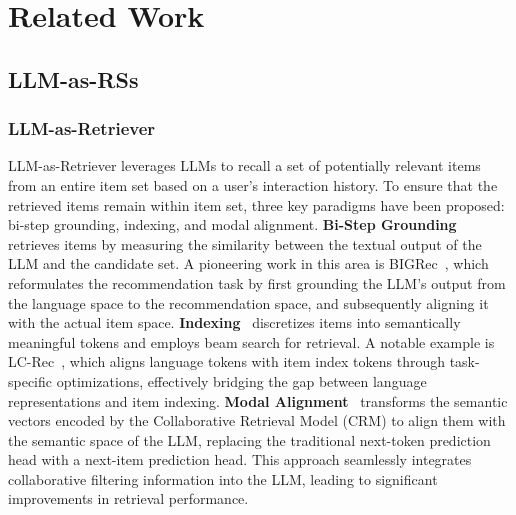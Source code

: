 \section{Related Work}
\subsection{LLM-as-RSs}

\subsubsection{LLM-as-Retriever}
LLM-as-Retriever leverages LLMs to recall a set of potentially relevant items from an entire item set based on a user's interaction history. To ensure that the retrieved items remain within item set, three key paradigms have been proposed: bi-step grounding, indexing, and modal alignment.
\textbf{Bi-Step Grounding}~\cite{lin2024bridging,gao2024sprec} retrieves items by measuring the similarity between the textual output of the LLM and the candidate set. A pioneering work in this area is BIGRec~\cite{bao2023bi}, which reformulates the recommendation task by first grounding the LLM’s output from the language space to the recommendation space, and subsequently aligning it with the actual item space.
\textbf{Indexing}~\cite{chen2024enhancing,li2024semantic} discretizes items into semantically meaningful tokens and employs beam search for retrieval. A notable example is LC-Rec~\cite{zheng2024adapting}, which aligns language tokens with item index tokens through task-specific optimizations, effectively bridging the gap between language representations and item indexing.
\textbf{Modal Alignment}~\cite{yu2024break,li2023e4srec,chen2024hllm,zhang2024recgpt} transforms the semantic vectors encoded by the Collaborative Retrieval Model (CRM) to align them with the semantic space of the LLM, replacing the traditional next-token prediction head with a next-item prediction head. This approach seamlessly integrates collaborative filtering information into the LLM, leading to significant improvements in retrieval performance.


